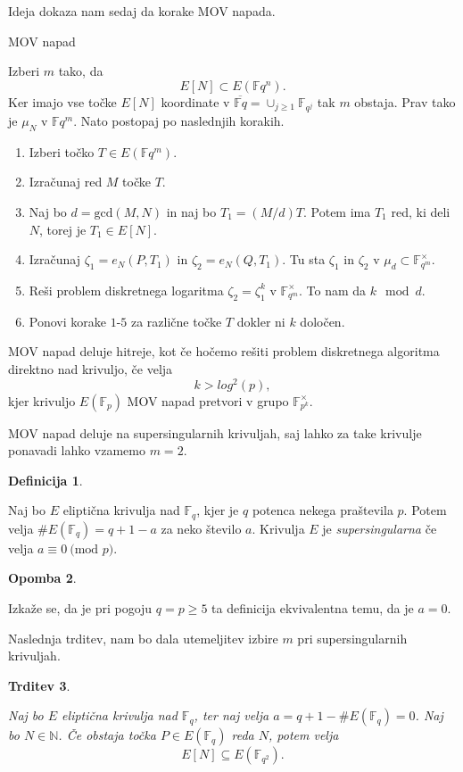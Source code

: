 \documentclass[12pt,a4paper,twoside]{article}
\theoremstyle{definition} %
\newtheorem{definicija}{Definicija}[section]
\newtheorem{opomba}[definicija]{Opomba}
\theoremstyle{plain} %
\newtheorem{trditev}[definicija]{Trditev}
\numberwithin{equation}{section}  %
\newcommand{\N}{\mathbb N}
\newcommand{\F}{\mathbb F}
\newcommand{\E}[1]{E({#1})}
\newcommand{\MOD}[1]{\ \text{(mod }{#1}\text{)}}
\begin{document}
Ideja dokaza nam sedaj da korake MOV napada.

\begin{algorithm}[H]
\caption[MOV]{MOV napad}
\label{alg:MOV}
Izberi $m$ tako, da $$E[N] \subset \E{\F{q^n}}.$$
Ker imajo vse točke $E[N]$ koordinate v $\overline{\F{q}} = \cup_{j\geq 1}\F_{q^j}$ tak $m$ obstaja. Prav tako je $\mu_N$ v $\F{q^m}$.
Nato postopaj po naslednjih korakih.
\begin{enumerate}
\item Izberi točko $T \in \E{\F{q^m}}$.
\item Izračunaj red $M$ točke $T$.
\item Naj bo $d = \text{gcd}(M,N)$ in naj bo $T_1 = (M/d)T$. Potem ima $T_1$ red, ki deli $N$, torej je $T_1 \in E[N]$.
\item Izračunaj $\zeta_1 = e_N(P,T_1)$ in $\zeta_2 = e_N(Q,T_1)$. Tu sta $\zeta_1$ in $\zeta_2$ v $\mu_d \subset \F_{q^m}^\times$.
\item Reši problem diskretnega logaritma $\zeta_2 = \zeta_1^k$ v $\F_{q^m}^\times$. To nam da $k \mod d$.
\item Ponovi korake $1$-$5$ za različne točke $T$ dokler ni $k$ določen.
\end{enumerate}

\end{algorithm}
MOV napad deluje hitreje, kot če hočemo rešiti problem diskretnega algoritma direktno nad krivuljo, če velja 
$$k > log^2(p),$$
kjer krivuljo $E(\F_p)$ MOV napad pretvori v grupo $\F^{\times}_{p^k}$.

MOV napad deluje na supersingularnih krivuljah, saj lahko za take krivulje ponavadi lahko vzamemo $m=2$.

\begin{definicija}~

Naj bo $E$ eliptična krivulja nad $\F_q$, kjer je $q$ potenca nekega praštevila $p$. Potem velja $\#\E{\F_q} = q+1-a$ za neko število $a$. Krivulja $E$ je \emph{supersingularna} če velja $a \equiv 0 \MOD{p}$.
\end{definicija}

\begin{opomba}~

Izkaže se, da je pri pogoju $q=p \geq 5$ ta definicija ekvivalentna temu, da je $a=0$.
\end{opomba}
Naslednja trditev, nam bo dala utemeljitev izbire $m$ pri supersingularnih krivuljah.

\begin{trditev}~

Naj bo $E$ eliptična krivulja nad $\F_q$, ter naj velja $a = q+1-\#\E{\F_q} =0$. Naj bo $N\in \N$. Če obstaja točka $P \in \E{\F_q}$ reda $N$, potem velja
$$E[N] \subseteq \E{\F_{q^2}}.$$
\end{trditev}
\end{document}

